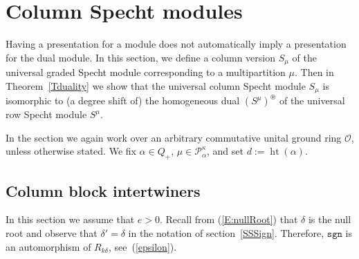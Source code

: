 \documentclass[twoside,11pt,reqno]{amsart}
\numberwithin{equation}{section}
\newtheorem{Theorem}[equation]{Theorem}
\theoremstyle{definition}  %
\def\sgn{\mathtt{sgn}}
\newcommand{\0}{{\bar 0}}
\newcommand{\1}{{\bar 1}}
\newcommand{\al}{\alpha}
\newcommand{\de}{\delta}
\newcommand\Par[1][]{{\mathscr P}^{\kappa#1}}
\def\height{{\operatorname{ht}}}
\def\RPar{{\mathscr{RP}}^\kappa}
\renewcommand\O{\mathcal O}
\begin{document}

\section{Column Specht modules}\label{SDualSpecht}
Having a presentation for a module does not automatically imply a presentation for the dual module. In this section, we define a column version $S_\mu$ of the universal graded Specht module corresponding to a multipartition $\mu$. Then in Theorem~\ref{Tduality} we show that the universal column Specht module $S_\mu$ is isomorphic to (a degree shift of) the homogeneous dual $(S^\mu)^\circledast$ of the universal row Specht module $S^\mu$. 



In the section we again work over an arbitrary commutative unital ground ring $\O$,  unless otherwise stated. We fix
$
\al\in Q_+
$, $\mu\in\Par_\al$, and set $d:=\height(\al)$. 

\subsection{Column block intertwiners}\label{Signed block intertwiners}
In this section we assume that $e>0$.  Recall from (\ref{E:nullRoot}) that $\delta$ is the null root and observe
that $\delta'=\delta$ in the notation of section~\ref{SSSign}. Therefore, 
$\sgn$ is an automorphism of $R_{k\de}$, see~(\ref{epsilon}).
\end{document}
